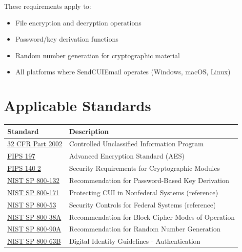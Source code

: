 \documentclass[11pt,letterpaper]{article}
\begin{document}
These requirements apply to:
\begin{itemize}[topsep=4pt, itemsep=2pt]
    \item File encryption and decryption operations
    \item Password/key derivation functions
    \item Random number generation for cryptographic material
    \item All platforms where SendCUIEmail operates (Windows, macOS, Linux)
\end{itemize}

\section{Applicable Standards}

\begin{tabularx}{\textwidth}{lX}
\toprule
\textbf{Standard} & \textbf{Description} \\
\midrule
\href{https://www.ecfr.gov/current/title-32/subtitle-B/chapter-XX/part-2002}{32 CFR Part 2002} & Controlled Unclassified Information Program \\
\href{https://csrc.nist.gov/pubs/fips/197/final}{FIPS 197} & Advanced Encryption Standard (AES) \\
\href{https://csrc.nist.gov/pubs/fips/140-2/final}{FIPS 140 2} & Security Requirements for Cryptographic Modules \\
\href{https://csrc.nist.gov/pubs/sp/800/132/final}{NIST SP 800-132} & Recommendation for Password-Based Key Derivation \\
\href{https://csrc.nist.gov/pubs/sp/800/171/r3/final}{NIST SP 800-171} & Protecting CUI in Nonfederal Systems (reference) \\
\href{https://csrc.nist.gov/pubs/sp/800/53/r5/upd1/final}{NIST SP 800-53} & Security Controls for Federal Systems (reference) \\
\href{https://csrc.nist.gov/pubs/sp/800/38/a/final}{NIST SP 800-38A} & Recommendation for Block Cipher Modes of Operation \\
\href{https://csrc.nist.gov/pubs/sp/800/90/a/r1/final}{NIST SP 800-90A} & Recommendation for Random Number Generation \\
\href{https://csrc.nist.gov/pubs/sp/800/63/b/upd2/final}{NIST SP 800-63B} & Digital Identity Guidelines - Authentication \\
\bottomrule
\end{tabularx}
\end{document}
